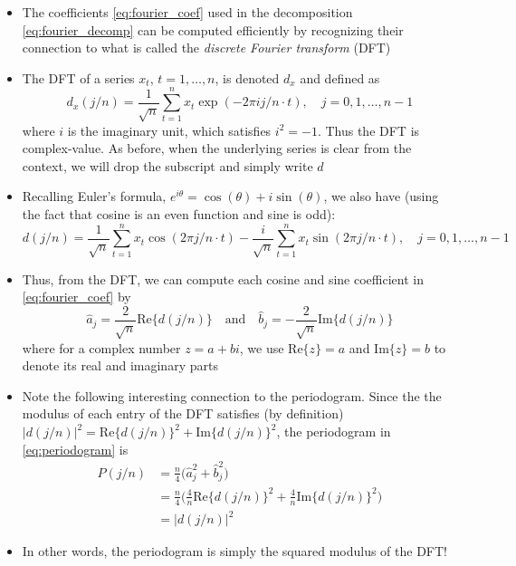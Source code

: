\documentclass{article}
\begin{document}
\begin{itemize}
\item The coefficients \eqref{eq:fourier_coef} used in the decomposition
  \eqref{eq:fourier_decomp} can be computed efficiently by recognizing their
  connection to what is called the \emph{discrete Fourier transform} (DFT) 

\item The DFT of a series $x_t$, $t = 1,\dots,n$, is denoted $d_x$ and defined
  as  
  \begin{equation}
  \label{eq:dft}
  d_x(j/n) = \frac{1}{\sqrt{n}} \sum_{t=1}^n x_t \exp(-2\pi i j/n \cdot t), 
  \quad j = 0,1,\dots,n-1 
  \end{equation}
  where $i$ is the imaginary unit, which satisfies $i^2 = -1$. Thus the DFT is
  complex-value. As before, when the underlying series is clear from the
  context, we will drop the subscript and simply write $d$ 

\item Recalling Euler's formula, $e^{i\theta} = \cos(\theta) + i \sin(\theta)$, 
  we also have (using the fact that cosine is an even function and sine is odd): 
  \[
  d(j/n) = \frac{1}{\sqrt{n}} \sum_{t=1}^n x_t \cos(2\pi j/n \cdot t) - 
  \frac{i}{\sqrt{n}} \sum_{t=1}^n x_t \sin(2\pi j/n \cdot t), \quad j =
  0,1,\dots,n-1   
  \]

\item Thus, from the DFT, we can compute each cosine and sine coefficient in
  \eqref{eq:fourier_coef} by
  \[
  \hat{a}_j = \frac{2}{\sqrt{n}} \mathrm{Re}\{d(j/n)\} \quad \text{and} \quad 
  \hat{b}_j = -\frac{2}{\sqrt{n}} \mathrm{Im}\{d(j/n)\}
  \]
  where for a complex number $z = a+bi$, we use $\mathrm{Re}\{z\} = a$ and
  $\mathrm{Im}\{z\} = b$ to denote its real and imaginary parts

\item Note the following interesting connection to the periodogram. Since the
  the modulus of each entry of the DFT satisfies (by definition) $|d(j/n)|^2 = 
  \mathrm{Re}\{d(j/n)\}^2 + \mathrm{Im}\{d(j/n)\}^2$, the periodogram in
  \eqref{eq:periodogram} is 
  \begin{align*}
  P(j/n) &= \frac{n}{4} \big( \hat{a}_j^2 + \hat{b}_j^2 \big) \\
  &= \frac{n}{4} \bigg( \frac{4}{n} \mathrm{Re}\{d(j/n)\}^2 +
    \frac{4}{n} \mathrm{Im}\{d(j/n)\}^2 \bigg) \\
  &= |d(j/n)|^2
  \end{align*}

\item In other words, the periodogram is simply the squared modulus of the DFT! 


\end{itemize}
\end{document}

